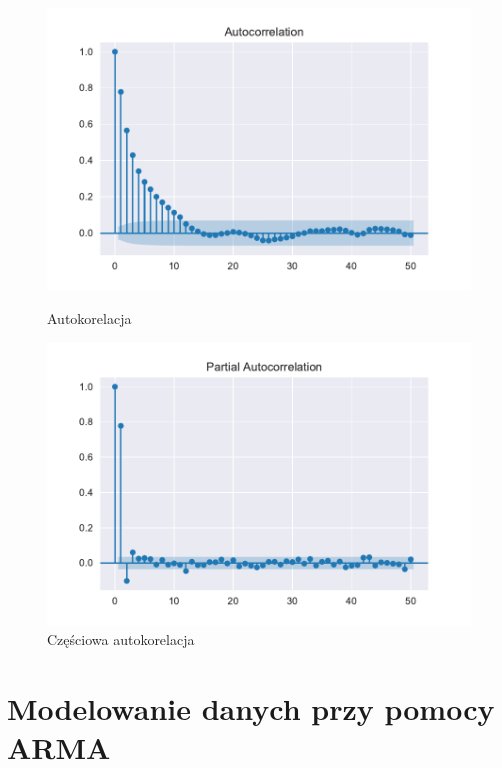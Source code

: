 \documentclass{article}
\theoremstyle{break}
\begin{document}
\begin{figure}[H]
	\begin{center}
		\begin{minipage}{0.49\linewidth}
			\centering
			\includegraphics[scale=0.49]{acf2.pdf}
			\caption{Autokorelacja}
			\label{fig:acf2}
		\end{minipage}
		\begin{minipage}{0.49\linewidth}
			\centering
			\includegraphics[scale=0.49]{pacf2.pdf}
			\caption{Częściowa autokorelacja}
			\label{fig:pacf2}
		\end{minipage}
	\end{center}
\end{figure}

\section{Modelowanie danych przy pomocy ARMA}
\end{document}
